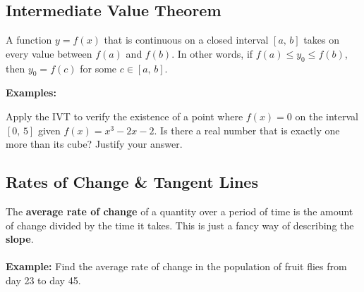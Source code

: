 \documentclass[addpoints, 12pt]{exam}
\begin{document}
\subsection*{Intermediate Value Theorem}
\begin{tcolorbox}[title= THE INTERMEDIATE VALUE THEOREM,colframe=black,sharp corners,colback=white,colbacktitle=white,coltitle=black,boxrule=1pt]

    A function $y=f(x)$ that is continuous on a closed interval $[a,\,b]$ takes on every value between $f(a)$ and $f(b)$. In other words, if $f(a)\le y_0\le f(b)$, then $y_0=f(c)$ for some $c\in[a,\,b]$.
\end{tcolorbox}
\vspace{.15cm}
\noindent\textbf{Examples:}
\begin{questions}
    \question Apply the IVT to verify the existence of a point where $f(x)=0$ on the interval $[0,\,5]$ given $f(x)=x^3-2x-2$.
    \question Is there a real number that is exactly one more than its cube? Justify your answer.
\end{questions}



\newpage
{}
\subsection*{Rates of Change \& Tangent Lines}

The \textbf{average rate of change} of a quantity over a period of time is the amount of change divided by the time it takes. This is just a fancy way of describing the \textbf{slope}.\\
\\
\noindent\textbf{Example:} Find the average rate of change in the population of fruit flies from day 23 to day 45.
\end{document}
